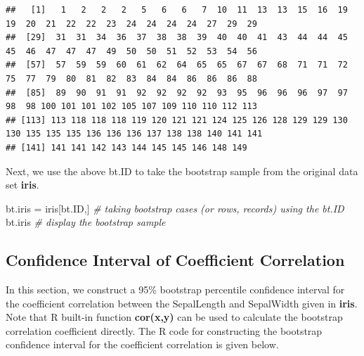 \documentclass[
]{book}
\newenvironment{Shaded}{\begin{snugshade}}{\end{snugshade}}
\newcommand{\CommentTok}[1]{\textcolor[rgb]{0.56,0.35,0.01}{\textit{#1}}}
\newcommand{\NormalTok}[1]{#1}
\newcommand{\OtherTok}[1]{\textcolor[rgb]{0.56,0.35,0.01}{#1}}
\begin{document}
\begin{verbatim}
##   [1]   1   2   2   2   5   6   6   7  10  11  13  13  15  16  19  19  20  21  22  22  23  24  24  24  24  27  29  29
##  [29]  31  31  34  36  37  38  38  39  40  40  41  43  44  44  45  45  46  47  47  47  49  50  50  51  52  53  54  56
##  [57]  57  59  59  60  61  62  64  65  65  67  67  68  71  71  72  75  77  79  80  81  82  83  84  84  86  86  86  88
##  [85]  89  90  91  91  92  92  92  92  93  95  96  96  96  97  97  98  98 100 101 101 102 105 107 109 110 110 112 113
## [113] 113 118 118 118 119 120 121 121 124 125 126 128 129 129 130 130 135 135 135 136 136 136 137 138 138 140 141 141
## [141] 141 141 142 143 144 145 145 146 148 149
\end{verbatim}

Next, we use the above bt.ID to take the bootstrap sample from the original data set \textbf{iris}.

\begin{Shaded}
\begin{Highlighting}[]
\NormalTok{bt.iris }\OtherTok{=}\NormalTok{ iris[bt.ID,]   }\CommentTok{\# taking bootstrap cases (or rows, records) using the bt.ID}
\NormalTok{bt.iris                  }\CommentTok{\# display the bootstrap sample}
\end{Highlighting}
\end{Shaded}

\hypertarget{confidence-interval-of-coefficient-correlation}{%
\subsection{Confidence Interval of Coefficient Correlation}\label{confidence-interval-of-coefficient-correlation}}

In this section, we construct a 95\% bootstrap percentile confidence interval for the coefficient correlation between the SepalLength and SepalWidth given in \textbf{iris}. Note that R built-in function \textbf{cor(x,y)} can be used to calculate the bootstrap correlation coefficient directly. The R code for constructing the bootstrap confidence interval for the coefficient correlation is given below.
\end{document}
